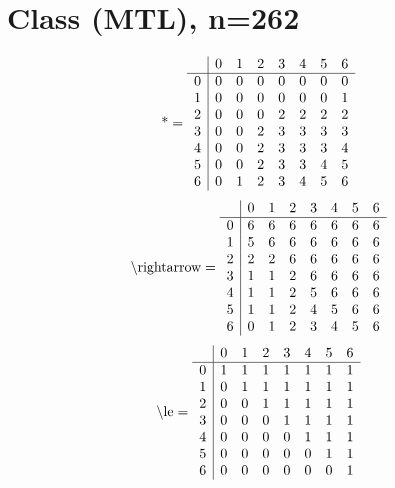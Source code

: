 \documentclass[11pt]{article}
\begin{document}
\section{Class (MTL), n=262}
\[\text{*} = 
\begin{array}{r | r r r r r r r}
 & 0 & 1 & 2 & 3 & 4 & 5 & 6 \\ \hline
0 & 0 & 0 & 0 & 0 & 0 & 0 & 0 \\
1 & 0 & 0 & 0 & 0 & 0 & 0 & 1 \\
2 & 0 & 0 & 0 & 2 & 2 & 2 & 2 \\
3 & 0 & 0 & 2 & 3 & 3 & 3 & 3 \\
4 & 0 & 0 & 2 & 3 & 3 & 3 & 4 \\
5 & 0 & 0 & 2 & 3 & 3 & 4 & 5 \\
6 & 0 & 1 & 2 & 3 & 4 & 5 & 6 \\
\end{array}
\]
\[\text{\textbackslash rightarrow} = 
\begin{array}{r | r r r r r r r}
 & 0 & 1 & 2 & 3 & 4 & 5 & 6 \\ \hline
0 & 6 & 6 & 6 & 6 & 6 & 6 & 6 \\
1 & 5 & 6 & 6 & 6 & 6 & 6 & 6 \\
2 & 2 & 2 & 6 & 6 & 6 & 6 & 6 \\
3 & 1 & 1 & 2 & 6 & 6 & 6 & 6 \\
4 & 1 & 1 & 2 & 5 & 6 & 6 & 6 \\
5 & 1 & 1 & 2 & 4 & 5 & 6 & 6 \\
6 & 0 & 1 & 2 & 3 & 4 & 5 & 6 \\
\end{array}
\]
\[\text{\textbackslash le} = 
\begin{array}{r | r r r r r r r}
 & 0 & 1 & 2 & 3 & 4 & 5 & 6 \\ \hline
0 & 1 & 1 & 1 & 1 & 1 & 1 & 1 \\
1 & 0 & 1 & 1 & 1 & 1 & 1 & 1 \\
2 & 0 & 0 & 1 & 1 & 1 & 1 & 1 \\
3 & 0 & 0 & 0 & 1 & 1 & 1 & 1 \\
4 & 0 & 0 & 0 & 0 & 1 & 1 & 1 \\
5 & 0 & 0 & 0 & 0 & 0 & 1 & 1 \\
6 & 0 & 0 & 0 & 0 & 0 & 0 & 1 \\
\end{array}
\]
\end{document}
